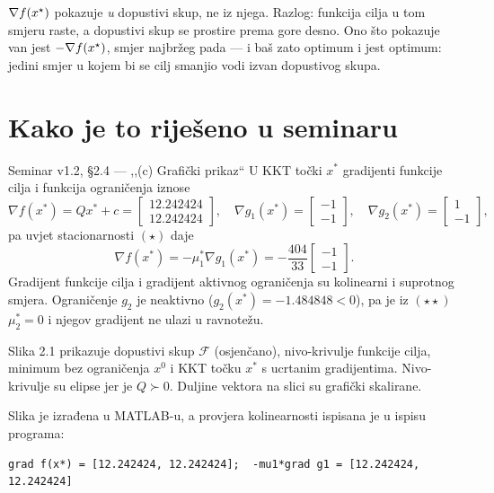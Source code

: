 \begin{zamka}
$\nabla f(x^{\star})$ pokazuje \emph{u} dopustivi skup, ne iz njega. Razlog: funkcija
cilja u tom smjeru raste, a dopustivi skup se prostire prema gore desno. Ono što
pokazuje van jest $-\nabla f(x^{\star})$, smjer najbržeg pada --- i baš zato optimum
i jest optimum: jedini smjer u kojem bi se cilj smanjio vodi izvan dopustivog
skupa.
\end{zamka}

\section{Kako je to riješeno u seminaru}
\label{sec:z1c-seminar}

\begin{seminar}{Seminar v1.2, §2.4 --- ,,(c) Grafički prikaz``}
U KKT točki $x^*$ gradijenti funkcije cilja i funkcija ograničenja iznose
\[
\nabla f(x^*) = Q x^* + c = \begin{bmatrix} 12.242424 \\ 12.242424 \end{bmatrix}, \quad
\nabla g_1(x^*) = \begin{bmatrix} -1 \\ -1 \end{bmatrix}, \quad
\nabla g_2(x^*) = \begin{bmatrix} 1 \\ -1 \end{bmatrix},
\]
pa uvjet stacionarnosti $(\star)$ daje
\[
\nabla f(x^*) = -\mu_1^* \nabla g_1(x^*) = -\frac{404}{33} \begin{bmatrix} -1 \\ -1 \end{bmatrix}.
\]
Gradijent funkcije cilja i gradijent aktivnog ograničenja su kolinearni i
suprotnog smjera. Ograničenje $g_2$ je neaktivno ($g_2(x^*) = -1.484848 < 0$), pa
je iz $(\star\star)$ $\mu_2^* = 0$ i njegov gradijent ne ulazi u ravnotežu.

Slika 2.1 prikazuje dopustivi skup $\mathcal{F}$ (osjenčano), nivo-krivulje
funkcije cilja, minimum bez ograničenja $x^0$ i KKT točku $x^*$ s ucrtanim
gradijentima. Nivo-krivulje su elipse jer je $Q \succ 0$. Duljine vektora na
slici su grafički skalirane.
\end{seminar}

Slika je izrađena u MATLAB-u, a provjera kolinearnosti ispisana je u ispisu
programa:

\begin{lstlisting}[style=outputstyle]
grad f(x*) = [12.242424, 12.242424];  -mu1*grad g1 = [12.242424, 12.242424]
\end{lstlisting}

